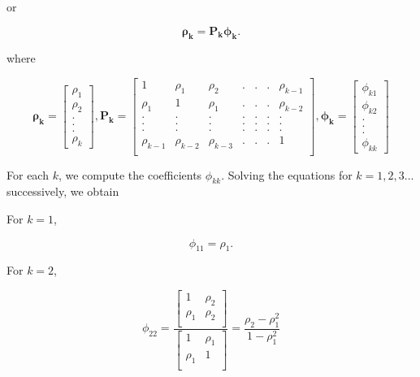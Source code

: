 \documentclass[
  11pt,
  a4paper,
]{report}
\begin{document}
or

\[\bm{\rho_k}=\bm{P_k\phi_k}.\]

where

\[\bm{\rho_k} = \left[\begin{array}
{r}
\rho_1  \\
\rho_2  \\
.\\
.\\
.\\
\rho_k
\end{array}\right], \bm{P_k} =\left[\begin{array}
{rrrrrrr}
1 & \rho_1 & \rho_2 & .&.&.& \rho_{k-1} \\
\rho_1 & 1 & \rho_1 & .&.&.& \rho_{k-2} \\
. & . & . & .&.&.& . \\
. & . & . & .&.&.& . \\
. & . & . & .&.&.& . \\
\rho_{k-1} & \rho_{k-2} & \rho_{k-3} & .&.&.& 1 \\
\end{array}\right], \bm{\phi_k} = \left[\begin{array}
{r}
\phi_{k1}  \\
\phi_{k2}  \\
.\\
.\\
.\\
\phi_{kk}
\end{array}\right]\]

For each \(k\), we compute the coefficients \(\phi_{kk}\). Solving the
equations for \(k=1, 2, 3...\) successively, we obtain

For \(k=1\),

\begin{equation}
\label{eq:p1}
\phi_{11}=\rho_1.
\end{equation}

For \(k=2\),

\begin{equation}
\label{eq:p2}
\phi_{22}=\frac{\left[\begin{array}
{rr}
1 & \rho_2  \\
\rho_1 & \rho_2  \\
\end{array}\right]}{\left[\begin{array}
{rr}
1 & \rho_1  \\
\rho_1 & 1  \\
\end{array}\right]} = \frac{\rho_2-\rho_1^2}{1-\rho_1^2}
\end{equation}
\end{document}
